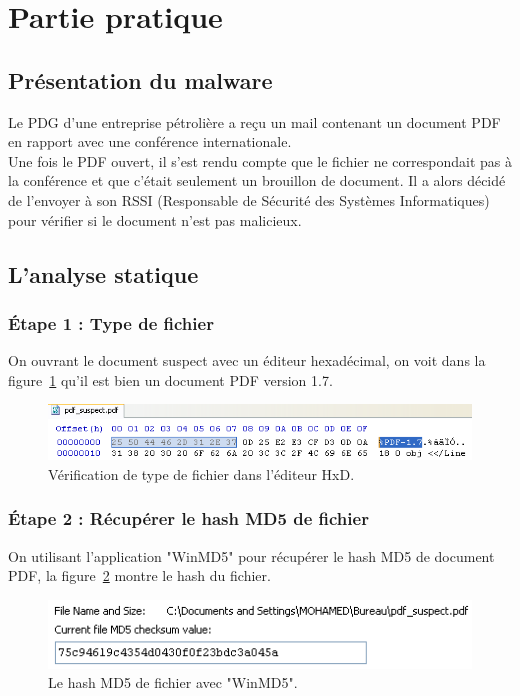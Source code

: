 \section{Partie pratique}
\subsection{Présentation du malware}
Le PDG d'une entreprise pétrolière a reçu un mail contenant un document PDF en rapport avec une conférence internationale.\\
Une fois le PDF ouvert, il s'est rendu compte que le fichier ne correspondait pas à la conférence et que c'était seulement un brouillon de document. Il a alors décidé de l'envoyer à son RSSI (Responsable de Sécurité des Systèmes Informatiques) pour vérifier si 
le document n'est pas malicieux.
\subsection{L'analyse statique}
\subsubsection*{Étape 1 : Type de fichier}
On ouvrant le document suspect avec un éditeur hexadécimal, on voit dans la figure~\ref{fig :anal1} qu'il est bien un document PDF version 1.7.
\begin{figure}[H]
\begin{center}
\includegraphics[scale=0.7]{Figures/anal1.png}
\caption{Vérification de type de fichier dans l'éditeur HxD.}
\label{fig :anal1} 
\end{center}
\end{figure}
\subsubsection*{Étape 2 : Récupérer le hash MD5 de fichier}
On utilisant l'application "WinMD5" pour récupérer le hash MD5 de document PDF, la figure~\ref{fig :anal2} montre le hash du fichier.
\begin{figure}[H]
\begin{center}
\includegraphics[scale=1]{Figures/anal2.png}
\caption{Le hash MD5 de fichier avec "WinMD5".}
\label{fig :anal2} 
\end{center}
\end{figure}
